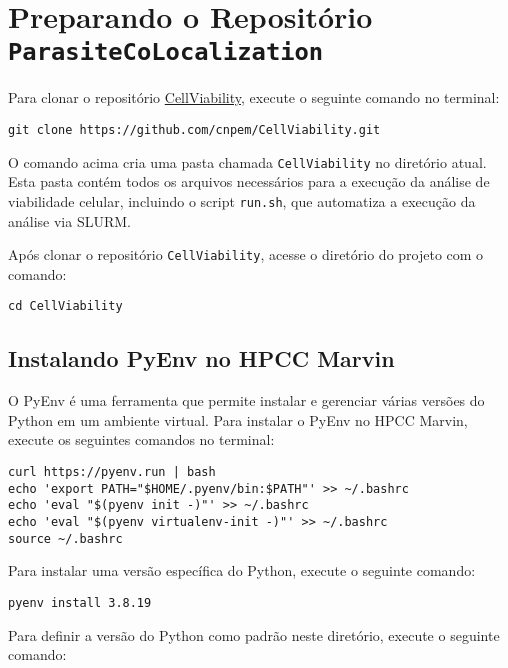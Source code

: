\documentclass{article}
\begin{document}
\section{Preparando o Repositório \texttt{ParasiteCoLocalization}}

Para clonar o repositório \href{https://github.com/cnpem/CellViability}{CellViability}, execute o seguinte comando no terminal:

\begin{verbatim}
git clone https://github.com/cnpem/CellViability.git
\end{verbatim}

O comando acima cria uma pasta chamada \texttt{CellViability} no diretório atual. Esta pasta contém todos os arquivos necessários para a execução da análise de viabilidade celular, incluindo o script \texttt{run.sh}, que automatiza a execução da análise via SLURM.

Após clonar o repositório \texttt{CellViability}, acesse o diretório do projeto com o comando:

\begin{verbatim}
cd CellViability
\end{verbatim}

\subsection{Instalando PyEnv no HPCC Marvin}

O PyEnv é uma ferramenta que permite instalar e gerenciar várias versões do Python em um ambiente virtual. Para instalar o PyEnv no HPCC Marvin, execute os seguintes comandos no terminal:

\begin{verbatim}
curl https://pyenv.run | bash
echo 'export PATH="$HOME/.pyenv/bin:$PATH"' >> ~/.bashrc
echo 'eval "$(pyenv init -)"' >> ~/.bashrc
echo 'eval "$(pyenv virtualenv-init -)"' >> ~/.bashrc
source ~/.bashrc
\end{verbatim}

Para instalar uma versão específica do Python, execute o seguinte comando:

\begin{verbatim}
pyenv install 3.8.19
\end{verbatim}

Para definir a versão do Python como padrão neste diretório, execute o seguinte comando:
\end{document}
